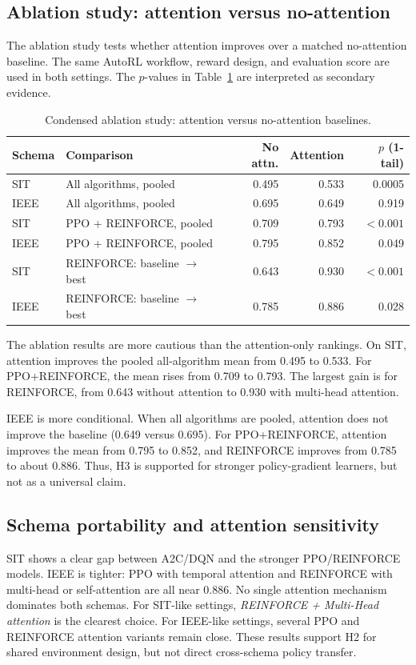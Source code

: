 \documentclass[sn-basic]{sn-jnl}%
\begin{document}
\subsection{Ablation study: attention versus no-attention}
\label{sec:ablation_results}
The ablation study tests whether attention improves over a matched no-attention baseline. The same AutoRL workflow, reward design, and evaluation score are used in both settings. The $p$-values in Table~\ref{tab:ablation_condensed} are interpreted as secondary evidence.

\begin{table}[htbp]
\centering
\caption{Condensed ablation study: attention versus no-attention baselines.}
\label{tab:ablation_condensed}
\begin{tabular}{l l r r r}
\toprule
\textbf{Schema} & \textbf{Comparison} & \textbf{No attn.} & \textbf{Attention} & \textbf{$p$ (1-tail)}\\
\midrule
SIT & All algorithms, pooled & 0.495 & 0.533 & 0.0005\\
IEEE & All algorithms, pooled & 0.695 & 0.649 & 0.919\\
SIT & PPO + \textsc{REINFORCE}, pooled & 0.709 & 0.793 & $<0.001$\\
IEEE & PPO + \textsc{REINFORCE}, pooled & 0.795 & 0.852 & 0.049\\
SIT & \textsc{REINFORCE}: baseline $\rightarrow$ best & 0.643 & 0.930 & $<0.001$\\
IEEE & \textsc{REINFORCE}: baseline $\rightarrow$ best & 0.785 & 0.886 & 0.028\\
\bottomrule
\end{tabular}
\end{table}

The ablation results are more cautious than the attention-only rankings. On SIT, attention improves the pooled all-algorithm mean from 0.495 to 0.533. For PPO+\textsc{REINFORCE}, the mean rises from 0.709 to 0.793. The largest gain is for \textsc{REINFORCE}, from 0.643 without attention to 0.930 with multi-head attention.

IEEE is more conditional. When all algorithms are pooled, attention does not improve the baseline (0.649 versus 0.695). For PPO+\textsc{REINFORCE}, attention improves the mean from 0.795 to 0.852, and \textsc{REINFORCE} improves from 0.785 to about 0.886. Thus, H3 is supported for stronger policy-gradient learners, but not as a universal claim.

\subsection{Schema portability and attention sensitivity}
SIT shows a clear gap between A2C/DQN and the stronger PPO/\textsc{REINFORCE} models. IEEE is tighter: PPO with temporal attention and \textsc{REINFORCE} with multi-head or self-attention are all near 0.886. No single attention mechanism dominates both schemas. For SIT-like settings, \emph{REINFORCE + Multi-Head attention} is the clearest choice. For IEEE-like settings, several PPO and \textsc{REINFORCE} attention variants remain close. These results support H2 for shared environment design, but not direct cross-schema policy transfer.
\end{document}
